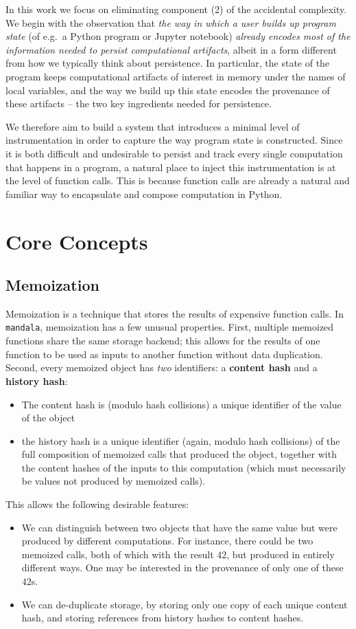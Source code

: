 \documentclass[11pt,twoside=semi,openright,numbers=noenddot]{scrartcl}
\begin{document}
In this work we focus on eliminating component (2) of the accidental complexity.
We begin with the observation that \emph{the way in which a user builds up
program state} (of e.g.\ a Python program or Jupyter notebook) \emph{already
encodes most of the information needed to persist computational artifacts},
albeit in a form different from how we typically think about persistence. In
particular, the state of the program keeps computational artifacts of interest
in memory under the names of local variables, and the way we build up this state
encodes the provenance of these artifacts -- the two key ingredients needed for
persistence.

We therefore aim to build a system that introduces a minimal level of
instrumentation in order to capture the way program state is constructed. Since
it is both difficult and undesirable to persist and track every single
computation that happens in a program, a natural place to inject this
instrumentation is at the level of function calls. This is because function
calls are already a natural and familiar way to encapsulate and compose 
computation in Python.

\section{Core Concepts}
\label{section:}

\subsection{Memoization}

Memoization is a technique that stores the results of expensive function calls.
In \texttt{mandala}, memoization has a few unusual properties. First, multiple
memoized functions share the same storage backend; this allows for the results
of one function to be used as inputs to another function without data
duplication. Second, every memoized object has \emph{two} identifiers: a
\textbf{content hash} and a \textbf{history hash}:
\begin{itemize}
\item The content hash is (modulo hash collisions) a unique identifier of the
value of the object
\item the history hash is a unique identifier (again, modulo hash collisions) of
the full composition of memoized calls that produced the object, together with the content hashes of the inputs to this computation (which must necessarily be values not produced by memoized calls).
\end{itemize}
This allows the following desirable features:
\begin{itemize}
\item We can distinguish between two objects that have the same value but were
produced by different computations. For instance, there could be two memoized
calls, both of which with the result $42$, but produced in entirely different
ways. One may be interested in the provenance of only one of these $42$s.
\item We can de-duplicate storage, by storing only one copy of each unique
content hash, and storing references from history hashes to content hashes.
\end{itemize}
\end{document}
